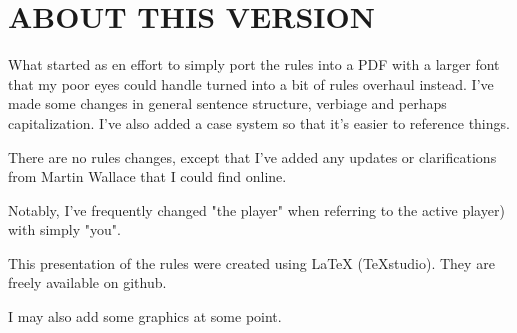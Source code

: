 \section{ABOUT THIS VERSION}

What started as en effort to simply port the rules into a PDF with a larger font that my poor eyes could handle turned into a bit of rules overhaul instead. I've made some changes in general sentence structure, verbiage and perhaps capitalization. I've also added a case system so that it's easier to reference things.

There are no rules changes, except that I've added any updates or clarifications from Martin Wallace that I could find online.

Notably, I've frequently changed "the player" when referring to the active player) with simply "you".

This presentation of the rules were created using LaTeX (TeXstudio). They are freely available on github.

I may also add some graphics at some point.